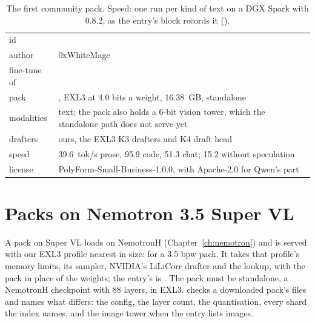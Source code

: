 \begin{table}[htbp]
\centering\small
\caption[The first community pack]{The first community pack. Speed: one run per kind of text on a DGX Spark with 0.8.2, as the entry's  block records it (\measured).}\label{tab:community-first}
\begin{tabularx}{\linewidth}{@{}L{.3\linewidth}Y@{}}
\toprule
{} &  \\
\midrule
id &  \\
author & 0xWhiteMage \\
fine-tune of &  \\
pack & , EXL3 at 4.0 bits a weight, 16.38~GB, standalone \\
modalities & text; the pack also holds a 6-bit vision tower, which the standalone path does not serve yet \\
drafters & ours, the EXL3 K3 drafters and K4 draft head \\
speed & 39.6~tok/s prose, 95.9 code, 51.3 chat; 15.2 without speculation \\
license & PolyForm-Small-Business-1.0.0, with Apache-2.0 for Qwen's part \\
\bottomrule
\end{tabularx}
\end{table}

\section{Packs on Nemotron 3.5 Super VL}\label{sec:community-supervl}

A pack on Super VL loads on NemotronH (Chapter~\ref{ch:nemotron}) and is served with our EXL3 profile nearest in size:  for a 3.5 bpw pack. It takes that profile's memory limits, its sampler, NVIDIA's LiLiCorr drafter and the lookup, with the pack in place of the weights; the entry's  is . The pack must be standalone, a NemotronH checkpoint with 88 layers, in EXL3.  checks a downloaded pack's files and names what differs: the config, the layer count, the quantisation, every shard the index names, and the image tower when the entry lists images.


